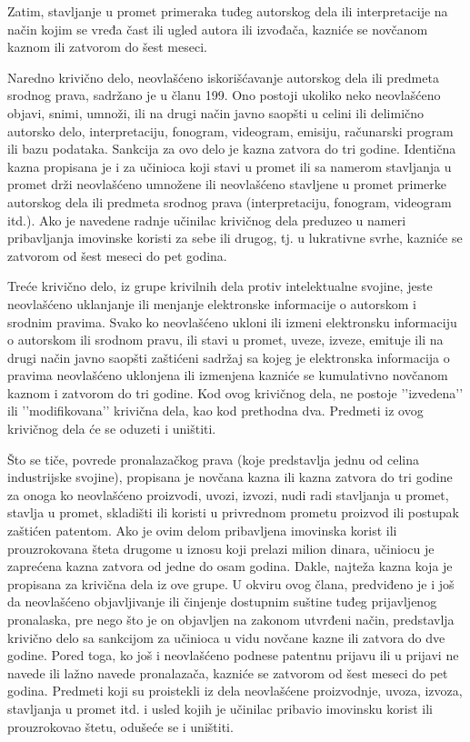 \documentclass[a4paper]{article}
\begin{document}
Zatim, stavljanje u promet primeraka tuđeg autorskog dela ili interpretacije na način kojim se vređa čast ili ugled autora ili izvođača, kazniće se novčanom kaznom ili zatvorom do šest meseci.

Naredno krivično delo, neovlašćeno iskorišćavanje autorskog dela ili predmeta srodnog prava, sadržano je u članu 199. Ono postoji ukoliko neko neovlašćeno objavi, snimi, umnoži, ili na drugi način javno saopšti u celini ili delimično autorsko delo, interpretaciju, fonogram, videogram, emisiju, računarski program ili bazu podataka. Sankcija za ovo delo je kazna zatvora do tri godine. Identična kazna propisana je i za učinioca koji stavi u promet ili sa namerom stavljanja u promet drži neovlašćeno umnožene ili neovlašćeno stavljene u promet primerke autorskog dela ili predmeta srodnog prava (interpretaciju, fonogram, videogram itd.). Ako je navedene radnje učinilac krivičnog dela preduzeo u nameri pribavljanja imovinske koristi za sebe ili drugog, tj. u lukrativne svrhe, kazniće se zatvorom od šest meseci do pet godina.

Treće krivično delo, iz grupe krivilnih dela protiv intelektualne svojine, jeste neovlašćeno uklanjanje ili menjanje elektronske informacije o autorskom i srodnim pravima. Svako ko neovlašćeno ukloni ili izmeni elektronsku informaciju o autorskom ili srodnom pravu, ili stavi u promet, uveze, izveze, emituje ili na drugi način javno saopšti zaštićeni sadržaj sa kojeg je elektronska informacija o pravima neovlašćeno uklonjena ili izmenjena kazniće se kumulativno novčanom kaznom i zatvorom do tri godine. Kod ovog krivičnog dela, ne postoje ’’izvedena’’ ili ’’modifikovana’’ krivična dela, kao kod prethodna dva. Predmeti iz ovog krivičnog dela će se oduzeti i uništiti.

Što se tiče, povrede pronalazačkog prava (koje predstavlja jednu od celina industrijske svojine), propisana je novčana kazna ili kazna zatvora do tri godine za onoga ko neovlašćeno proizvodi, uvozi, izvozi, nudi radi stavljanja u promet, stavlja u promet, skladišti ili koristi u privrednom prometu proizvod ili postupak zaštićen patentom. Ako je ovim delom pribavljena imovinska korist ili prouzrokovana šteta drugome u iznosu koji prelazi milion dinara, učiniocu je zaprećena kazna zatvora od jedne do osam godina. Dakle, najteža kazna koja je propisana za krivična dela iz ove grupe. U okviru ovog člana, predviđeno je i još da neovlašćeno objavljivanje ili činjenje dostupnim suštine tuđeg prijavljenog pronalaska, pre nego što je on objavljen na zakonom utvrđeni način, predstavlja krivično delo sa sankcijom za učinioca u vidu novčane kazne ili zatvora do dve godine. Pored toga, ko još i neovlašćeno podnese patentnu prijavu ili u prijavi ne navede ili lažno navede pronalazača, kazniće se zatvorom od šest meseci do pet godina. Predmeti koji su proistekli iz dela neovlašćene proizvodnje, uvoza, izvoza, stavljanja u promet itd. i usled kojih je učinilac pribavio imovinsku korist ili prouzrokovao štetu, odušeće se i uništiti.
\end{document}
